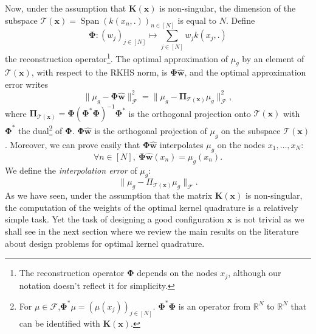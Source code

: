 \documentclass[twoside,11pt]{book}
\numberwithin{theorem}{chapter}
\numberwithin{definition}{chapter}
\numberwithin{proposition}{chapter}
\numberwithin{corollary}{chapter}
\numberwithin{example}{chapter}
\numberwithin{lemma}{chapter}
\DeclareMathOperator{\Span}{\mathrm{Span}}
\begin{document}
Now, under the assumption that $\bm{K}(\bm{x})$ is non-singular, the dimension of the subspace $\mathcal{T}(\bm{x}) = \Span (k(x_{n},.))_{n \in [N]}$ is equal to $N$. Define 
\begin{equation}
	\bm{\Phi}:(w_{j})_{j \in [N]} \mapsto \sum_{j \in [N]} w_{j} k(x_{j},.)
\end{equation}
 the reconstruction operator\footnote{The reconstruction operator $\bm{\Phi}$ depends on the nodes $x_{j}$, although our notation doesn't reflect it for simplicity.}. The optimal approximation of $\mu_{g}$ by an element of $\mathcal{T}(\bm{x})$, with respect to the RKHS norm, is $\bm{\Phi}\hat{\bm{w}}$, and the optimal approximation error writes
\begin{equation}
\|\mu_{g} - \bm{\Phi}\hat{\bm{w}}\|^{2}_{\mathcal{F}} =\|\mu_{g} - \bm{\Pi}_{\mathcal{T}(\bm{x})}\mu_{g}\|^{2}_{\mathcal{F}},\label{e:finalTool}
\end{equation}
where $\bm{\Pi}_{\mathcal{T}(\bm{x})} = \bm{\Phi}(\bm{\Phi}^{*}\bm{\Phi})^{-1}\bm{\Phi}^{*}$ is the orthogonal projection onto $\mathcal{T}(\bm{x})$ with $\bm{\Phi}^{*}$ the dual\footnote{For $\mu \in \mathcal{F}$,$\bm{\Phi}^{*}\mu = (\mu(x_{j}))_{j \in [N]}$. $\bm{\Phi}^{*}\bm{\Phi}$ is an operator from $\mathbb{R}^{N}$ to $\mathbb{R}^{N}$ that can be identified with $\bm{K}(\bm{x})$.} of $\bm{\Phi}$. $\bm{\Phi}\hat{\bm{w}}$ is the orthogonal projection of $\mu_{g}$ on the subspace $\mathcal{T}(\bm{x})$. Moreover, we can prove easily that $\bm{\Phi}\hat{\bm{w}}$ interpolates $\mu_{g}$ on the nodes $x_{1}, \dots, x_{N}$:
\begin{equation}
\forall n \in [N], \:\bm{\Phi}\hat{\bm{w}}(x_{n}) = \mu_{g}(x_{n}).
\end{equation}
We define the \emph{interpolation error} of $\mu_{g}$:
\begin{equation}
\|\mu_{g}- \Pi_{\mathcal{T}(\bm{x})}\mu_{g}\|_{\mathcal{F}}.
\end{equation}
As we have seen, under the assumption that the matrix $\bm{K}(\bm{x})$ is non-singular, the computation of the weights of the optimal kernel quadrature is a relatively simple task. Yet the task of designing a good configuration $\bm{x}$ is not trivial as we shall see in the next section where we review the main results on the literature about design problems for optimal kernel quadrature.
\end{document}
